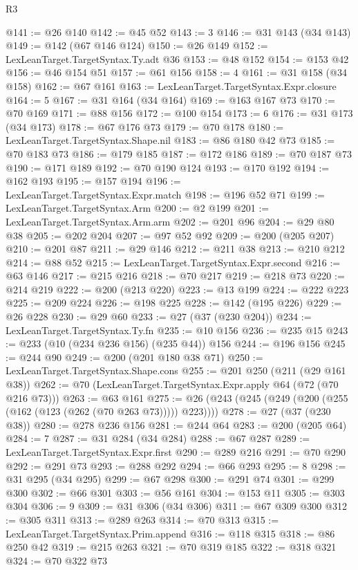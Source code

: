\begin{lexlean}{R3}
\begin{coremodule}
{{{{{{{{{{{{{{{{{{{{{{{{{{@141 := @26 @140
@142 := @45 @52
@143 := 3
@146 := @31 @143 (@34 @143)
@149 := @142 (@67 @146 @124)
@150 := @26 @149
@152 := LexLeanTarget.TargetSyntax.Ty.adt @36
@153 := @48 @152
@154 := @153 @42
@156 := @46 @154 @51
@157 := @61 @156
@158 := 4
@161 := @31 @158 (@34 @158)
@162 := @67 @161
@163 := LexLeanTarget.TargetSyntax.Expr.closure
@164 := 5
@167 := @31 @164 (@34 @164)
@169 := @163 @167 @73
@170 := @70 @169
@171 := @88 @156
@172 := @100 @154
@173 := 6
@176 := @31 @173 (@34 @173)
@178 := @67 @176 @73
@179 := @70 @178
@180 := LexLeanTarget.TargetSyntax.Shape.nil
@183 := @86 @180 @42 @73
@185 := @70 @183 @73
@186 := @179 @185
@187 := @172 @186
@189 := @70 @187 @73
@190 := @171 @189
@192 := @70 @190 @124
@193 := @170 @192
@194 := @162 @193
@195 := @157 @194
@196 := LexLeanTarget.TargetSyntax.Expr.match
@198 := @196 @52 @71
@199 := LexLeanTarget.TargetSyntax.Arm
@200 := @2 @199
@201 := LexLeanTarget.TargetSyntax.Arm.arm
@202 := @201 @96
@204 := @29 @80 @38
@205 := @202 @204
@207 := @97 @52 @92
@209 := @200 (@205 @207)
@210 := @201 @87
@211 := @29 @146
@212 := @211 @38
@213 := @210 @212
@214 := @88 @52
@215 := LexLeanTarget.TargetSyntax.Expr.second
@216 := @63 @146
@217 := @215 @216
@218 := @70 @217
@219 := @218 @73
@220 := @214 @219
@222 := @200 (@213 @220)
@223 := @13 @199
@224 := @222 @223
@225 := @209 @224
@226 := @198 @225
@228 := @142 (@195 @226)
@229 := @26 @228
@230 := @29 @60
@233 := @27 (@37 (@230 @204))
@234 := LexLeanTarget.TargetSyntax.Ty.fn
@235 := @10 @156
@236 := @235 @15
@243 := @233 (@10 (@234 @236 @156) (@235 @44)) @156
@244 := @196 @156
@245 := @244 @90
@249 := @200 (@201 @180 @38 @71)
@250 := LexLeanTarget.TargetSyntax.Shape.cons
@255 := @201 @250 (@211 (@29 @161 @38))
@262 := @70 (LexLeanTarget.TargetSyntax.Expr.apply @64 (@72 (@70 @216 @73)))
@263 := @63 @161
@275 := @26 (@243 (@245 (@249 (@200 (@255 (@162 (@123 (@262 (@70 @263 @73))))) @223))))
@278 := @27 (@37 (@230 @38))
@280 := @278 @236 @156
@281 := @244 @64
@283 := @200 (@205 @64)
@284 := 7
@287 := @31 @284 (@34 @284)
@288 := @67 @287
@289 := LexLeanTarget.TargetSyntax.Expr.first
@290 := @289 @216
@291 := @70 @290
@292 := @291 @73
@293 := @288 @292
@294 := @66 @293
@295 := 8
@298 := @31 @295 (@34 @295)
@299 := @67 @298
@300 := @291 @74
@301 := @299 @300
@302 := @66 @301
@303 := @56 @161
@304 := @153 @11
@305 := @303 @304
@306 := 9
@309 := @31 @306 (@34 @306)
@311 := @67 @309 @300
@312 := @305 @311
@313 := @289 @263
@314 := @70 @313
@315 := LexLeanTarget.TargetSyntax.Prim.append
@316 := @118 @315
@318 := @86 @250 @42
@319 := @215 @263
@321 := @70 @319 @185
@322 := @318 @321
@324 := @70 @322 @73
}}}}}}}}}}}}}}}}}}}}}}}}}}
\end{coremodule}
\end{lexlean}
